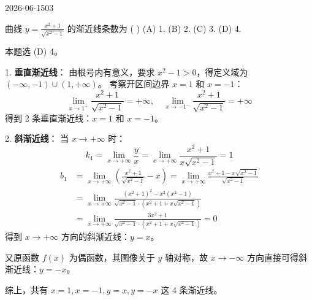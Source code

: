 \begin{mistake}{2026-06-15}{03}

\begin{problemcontent}
曲线 \(y = \frac{x^2+1}{\sqrt{x^2-1}}\) 的渐近线条数为 ( )
(A) 1.
(B) 2.
(C) 3.
(D) 4.
\end{problemcontent}

\begin{solutioncontent}
本题选 (D) 4。

1. \textbf{垂直渐近线}：
由根号内有意义，要求 \(x^2 - 1 > 0\)，得定义域为 \((-\infty, -1) \cup (1, +\infty)\)。
考察开区间边界 \(x=1\) 和 \(x=-1\)：
\[
\lim_{x \to 1^+} \frac{x^2+1}{\sqrt{x^2-1}} = +\infty, \quad \lim_{x \to -1^-} \frac{x^2+1}{\sqrt{x^2-1}} = +\infty
\]
得到 2 条垂直渐近线：\(x=1\) 和 \(x=-1\)。

2. \textbf{斜渐近线}：
当 \(x \to +\infty\) 时：
\[
k_1 = \lim_{x \to +\infty} \frac{y}{x} = \lim_{x \to +\infty} \frac{x^2+1}{x\sqrt{x^2-1}} = 1
\]
\[
\begin{aligned}
b_1 &= \lim_{x \to +\infty} \left( \frac{x^2+1}{\sqrt{x^2-1}} - x \right) = \lim_{x \to +\infty} \frac{x^2+1 - x\sqrt{x^2-1}}{\sqrt{x^2-1}} \\
&= \lim_{x \to +\infty} \frac{(x^2+1)^2 - x^2(x^2-1)}{\sqrt{x^2-1} \cdot (x^2+1 + x\sqrt{x^2-1})} \\
&= \lim_{x \to +\infty} \frac{3x^2+1}{\sqrt{x^2-1} \cdot (x^2+1 + x\sqrt{x^2-1})} = 0
\end{aligned}
\]
得到 \(x \to +\infty\) 方向的斜渐近线：\(y = x\)。

又原函数 \(f(x)\) 为偶函数，其图像关于 \(y\) 轴对称，故 \(x \to -\infty\) 方向直接可得斜渐近线：\(y = -x\)。

综上，共有 \(x=1, x=-1, y=x, y=-x\) 这 4 条渐近线。
\end{solutioncontent}


\end{mistake}
